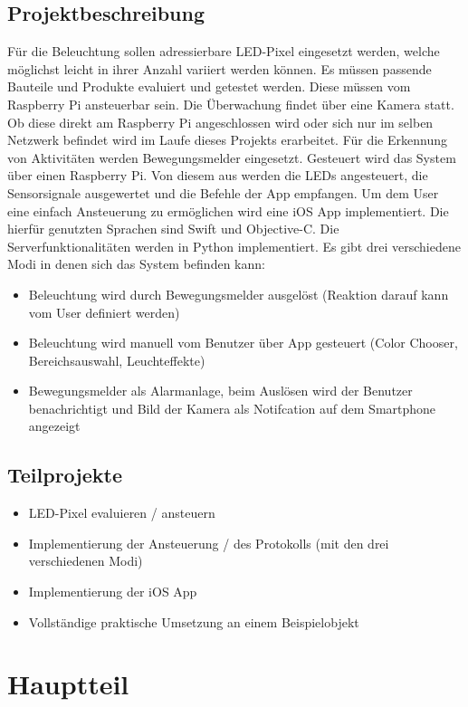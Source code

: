 \documentclass[12pt,a4paper]{scrreprt}
\begin{document}
\section{Projektbeschreibung}
Für die Beleuchtung sollen adressierbare LED-Pixel eingesetzt werden, welche möglichst leicht in ihrer Anzahl variiert werden können. Es müssen passende Bauteile und Produkte evaluiert und getestet werden. Diese müssen vom Raspberry Pi ansteuerbar sein.
Die Überwachung findet über eine Kamera statt. Ob diese direkt am Raspberry Pi angeschlossen wird oder sich nur im selben Netzwerk befindet wird im Laufe dieses Projekts erarbeitet. Für die Erkennung von Aktivitäten werden Bewegungsmelder eingesetzt. 
Gesteuert wird das System über einen Raspberry Pi. Von diesem aus werden die LEDs angesteuert, die Sensorsignale ausgewertet und die Befehle der App empfangen.
Um dem User eine einfach Ansteuerung zu ermöglichen wird eine iOS App implementiert. Die hierfür genutzten Sprachen sind Swift und Objective-C. Die Serverfunktionalitäten werden in Python implementiert.
Es gibt drei verschiedene Modi in denen sich das System befinden kann:
\begin{itemize}
\item Beleuchtung wird durch Bewegungsmelder ausgelöst (Reaktion darauf kann vom User definiert werden)
\item Beleuchtung wird manuell vom Benutzer über App gesteuert (Color Chooser, Bereichsauswahl, Leuchteffekte)
\item Bewegungsmelder als Alarmanlage, beim Auslösen wird der Benutzer benachrichtigt und Bild der Kamera als Notifcation auf dem Smartphone angezeigt
\end{itemize}

\section{Teilprojekte}
\begin{itemize}
\item LED-Pixel evaluieren / ansteuern
\item Implementierung der Ansteuerung / des Protokolls (mit den drei verschiedenen Modi)
\item Implementierung der iOS App
\item Vollständige praktische Umsetzung an einem Beispielobjekt
\end{itemize}

\chapter{Hauptteil}
\end{document}
